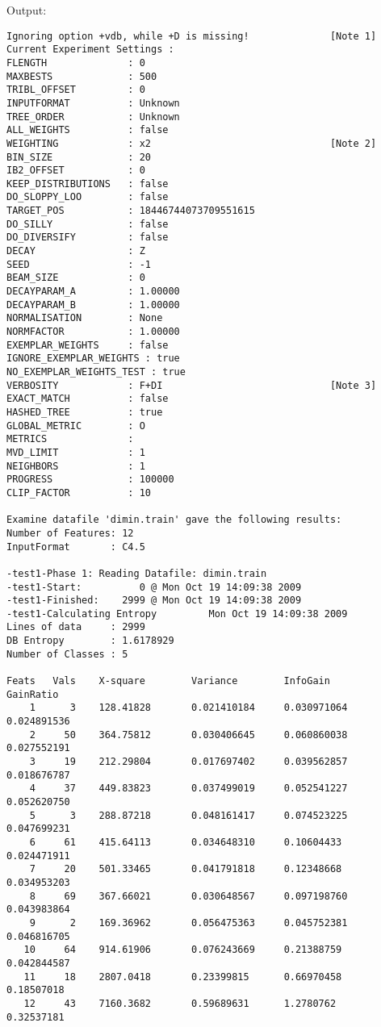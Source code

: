 \documentclass{report}
\begin{document}
Output:
\begin{footnotesize}
\begin{verbatim}
Ignoring option +vdb, while +D is missing!              [Note 1]
Current Experiment Settings :
FLENGTH              : 0
MAXBESTS             : 500
TRIBL_OFFSET         : 0
INPUTFORMAT          : Unknown
TREE_ORDER           : Unknown
ALL_WEIGHTS          : false
WEIGHTING            : x2                               [Note 2]
BIN_SIZE             : 20
IB2_OFFSET           : 0
KEEP_DISTRIBUTIONS   : false
DO_SLOPPY_LOO        : false
TARGET_POS           : 18446744073709551615
DO_SILLY             : false
DO_DIVERSIFY         : false
DECAY                : Z
SEED                 : -1
BEAM_SIZE            : 0
DECAYPARAM_A         : 1.00000
DECAYPARAM_B         : 1.00000
NORMALISATION        : None
NORMFACTOR           : 1.00000
EXEMPLAR_WEIGHTS     : false
IGNORE_EXEMPLAR_WEIGHTS : true
NO_EXEMPLAR_WEIGHTS_TEST : true
VERBOSITY            : F+DI                             [Note 3]
EXACT_MATCH          : false
HASHED_TREE          : true
GLOBAL_METRIC        : O
METRICS              : 
MVD_LIMIT            : 1
NEIGHBORS            : 1
PROGRESS             : 100000
CLIP_FACTOR          : 10

Examine datafile 'dimin.train' gave the following results:
Number of Features: 12
InputFormat       : C4.5

-test1-Phase 1: Reading Datafile: dimin.train
-test1-Start:          0 @ Mon Oct 19 14:09:38 2009
-test1-Finished:    2999 @ Mon Oct 19 14:09:38 2009
-test1-Calculating Entropy         Mon Oct 19 14:09:38 2009
Lines of data     : 2999
DB Entropy        : 1.6178929
Number of Classes : 5

Feats   Vals    X-square        Variance        InfoGain        GainRatio
    1      3    128.41828       0.021410184     0.030971064     0.024891536
    2     50    364.75812       0.030406645     0.060860038     0.027552191
    3     19    212.29804       0.017697402     0.039562857     0.018676787
    4     37    449.83823       0.037499019     0.052541227     0.052620750
    5      3    288.87218       0.048161417     0.074523225     0.047699231
    6     61    415.64113       0.034648310     0.10604433      0.024471911
    7     20    501.33465       0.041791818     0.12348668      0.034953203
    8     69    367.66021       0.030648567     0.097198760     0.043983864
    9      2    169.36962       0.056475363     0.045752381     0.046816705
   10     64    914.61906       0.076243669     0.21388759      0.042844587
   11     18    2807.0418       0.23399815      0.66970458      0.18507018
   12     43    7160.3682       0.59689631      1.2780762       0.32537181


\end{verbatim}
\end{footnotesize}
\end{document}
